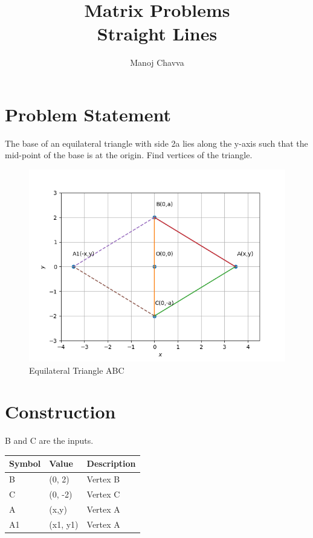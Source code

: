 \documentclass[journal,12pt,twocolumn]{IEEEtran}
\title{Matrix Problems \textbf{\\Straight Lines }}
\author{Manoj Chavva}
\begin{document}
\maketitle



\section{Problem Statement}

\noindent The base of an equilateral triangle with side 2a lies along the y-axis such that the mid-point of the base is at the origin. Find vertices of the triangle.


\begin{figure}[h]
\includegraphics[width=1\columnwidth]{triangle.png}
\caption{Equilateral Triangle ABC}
\label{fig:triangle}
\end{figure}

\section{Construction}
B and C are the inputs.
\begin{table}[h]
\centering
\large
\begin{tabular}{|l|l|l|}
\hline
\textbf{Symbol} & \textbf{Value} & \textbf{Description} \\ \hline
B               & (0, 2)         & Vertex B             \\ \hline
C               & (0, -2)        & Vertex C             \\ \hline
A               & (x,y)          & Vertex A             \\ \hline
A1              & (x1, y1)       & Vertex A            \\ \hline
\end{tabular}
\end{table}
\end{document}
